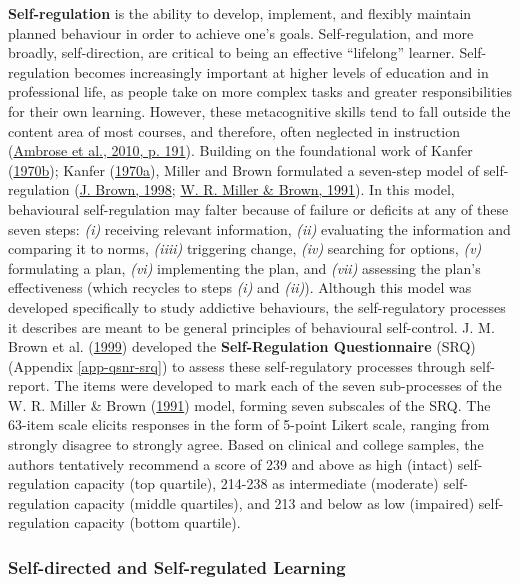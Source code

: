 \documentclass[letterpaper, nobind]{templates/ociamthesis}
\begin{document}
\textbf{Self-regulation} is the ability to develop, implement, and flexibly
maintain planned behaviour in order to achieve one's goals.
Self-regulation, and more broadly, self-direction, are critical to being
an effective ``lifelong'' learner. Self-regulation becomes increasingly
important at higher levels of education and in professional life, as
people take on more complex tasks and greater responsibilities for their
own learning. However, these metacognitive skills tend to fall outside
the content area of most courses, and therefore, often neglected in
instruction (\protect\hyperlink{ref-ambrose2010howa}{Ambrose et al., 2010, p. 191}). Building on the foundational work
of Kanfer (\protect\hyperlink{ref-kanfer1970self-a}{1970b}); Kanfer (\protect\hyperlink{ref-kanfer1970self-b}{1970a}), Miller and Brown formulated a
seven-step model of self-regulation (\protect\hyperlink{ref-brown1998self}{J. Brown, 1998}; \protect\hyperlink{ref-miller1991self}{W. R. Miller \& Brown, 1991}).
In this model, behavioural self-regulation may falter because of failure
or deficits at any of these seven steps: \emph{(i)} receiving relevant
information, \emph{(ii)} evaluating the information and comparing it to
norms, \emph{(iiii)} triggering change, \emph{(iv)} searching for options, \emph{(v)}
formulating a plan, \emph{(vi)} implementing the plan, and \emph{(vii)} assessing
the plan's effectiveness (which recycles to steps \emph{(i)} and \emph{(ii)}).
Although this model was developed specifically to study addictive
behaviours, the self-regulatory processes it describes are meant to be
general principles of behavioural self-control.
J. M. Brown et al. (\protect\hyperlink{ref-brown1999self}{1999}) developed the \textbf{Self-Regulation Questionnaire} (SRQ) (Appendix
\ref{app-qsnr-srq}) to
assess these self-regulatory processes through self-report. The items
were developed to mark each of the seven sub-processes of the
W. R. Miller \& Brown (\protect\hyperlink{ref-miller1991self}{1991}) model, forming seven subscales of the SRQ. The 63-item
scale elicits responses in the form of 5-point Likert scale, ranging
from strongly disagree to strongly agree. Based on clinical and college
samples, the authors tentatively recommend a score of 239 and above as
high (intact) self-regulation capacity (top quartile), 214-238 as
intermediate (moderate) self-regulation capacity (middle quartiles), and
213 and below as low (impaired) self-regulation capacity (bottom
quartile).

\hypertarget{self-directed-and-self-regulated-learning}{%
\subsubsection{Self-directed and Self-regulated Learning}\label{self-directed-and-self-regulated-learning}}
\end{document}
